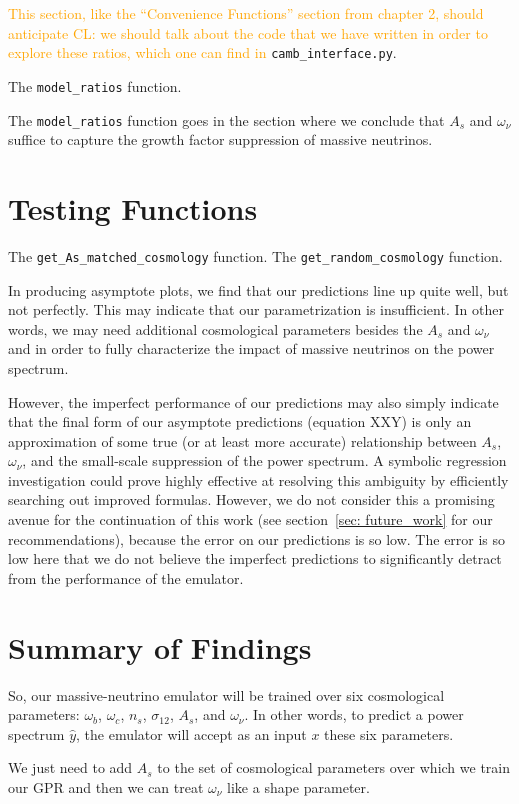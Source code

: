\textcolor{orange}{This section, like the ``Convenience Functions'' section
from chapter 2, should anticipate CL: we should talk about the
code that we have written in order to explore these ratios, which one can find
in} \verb|camb_interface.py|.

The \verb|model_ratios| function.

The \verb|model_ratios| function goes in the section where we conclude that 
$A_s$ and $\omega_\nu$ suffice to capture the growth factor suppression of 
massive neutrinos.


\section{Testing Functions}

The \verb|get_As_matched_cosmology| function.
The \verb|get_random_cosmology| function.

In producing asymptote plots, we find that our predictions line up quite well,
but not perfectly. This may indicate that our parametrization is insufficient.
In other words, we may need additional cosmological parameters besides the
$A_s$ and $\omega_\nu$ and in order to fully characterize the impact of
massive neutrinos on the power spectrum.

However, the imperfect performance of our predictions may also simply
indicate that the final form of our asymptote predictions (equation XXY) is
only an approximation of some true (or at least more accurate) relationship
between $A_s$, $\omega_\nu$, and the small-scale suppression of the power
spectrum. A symbolic regression investigation could prove highly effective at
resolving this ambiguity by efficiently searching out improved formulas. 
However, we do not consider this a promising avenue
for the continuation of this work (see section~\ref{sec: future_work} for our
recommendations), because the error on our predictions is so low. The error
is so low here that we do not believe the imperfect predictions to
significantly detract from the performance of the emulator.

\section{Summary of Findings}


So, our massive-neutrino emulator will be trained over six cosmological
parameters: $\omega_b$, $\omega_c$, $n_s$, $\sigma_{12}$, $A_s$, and
$\omega_\nu$. In other words, to predict a power
spectrum $\hat{y}$, the emulator will accept as an input $x$ these six
parameters.


We just need to add $A_s$ to the set of cosmological parameters
over which we train our GPR and then we can treat $\omega_\nu$ like a shape
parameter.
